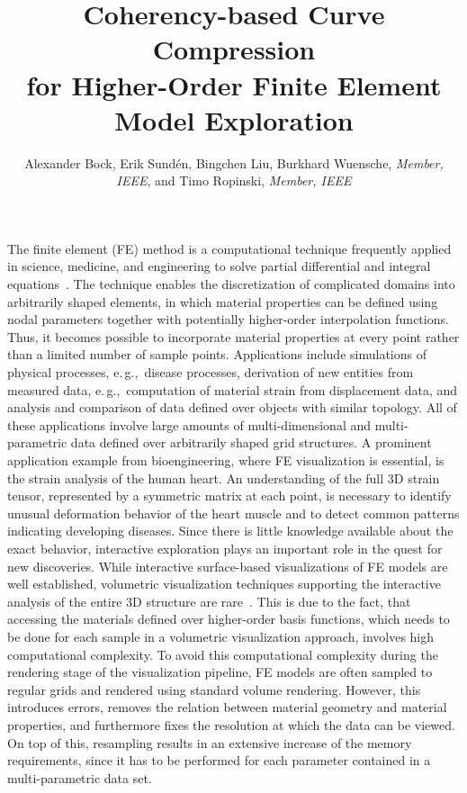 \documentclass[review,journal]{vgtc}         %
\title{Coherency-based Curve Compression\\ for Higher-Order Finite Element Model Exploration}
\author{Alexander Bock, Erik Sund\'en, Bingchen Liu, Burkhard Wuensche, \textit{Member, IEEE}, and Timo Ropinski, \textit{Member, IEEE}}
\begin{document}

\label{sec:introduction}

\maketitle

The finite element (FE) method is a computational technique frequently applied in science, medicine, and engineering to solve partial differential and integral equations~\cite{Young00}. The technique enables the discretization of complicated domains into arbitrarily shaped elements, in which material properties can be defined using nodal parameters together with potentially higher-order interpolation functions. Thus, it becomes possible to incorporate material properties at every point rather than a limited number of sample points. Applications include simulations of physical processes, e.\,g.,~disease processes, derivation of new entities from measured data, e.\,g.,~computation of material strain from displacement data, and analysis and comparison of data defined over objects with similar topology. All of these applications involve large amounts of multi-dimensional and multi-parametric data defined over arbitrarily shaped grid structures. A prominent application example from bioengineering, where FE visualization is essential, is the strain analysis of the human heart. An understanding of the full 3D strain tensor, represented by a symmetric matrix at each point, is necessary to identify unusual deformation behavior of the heart muscle and to detect common patterns indicating developing diseases. Since there is little knowledge available about the exact behavior, interactive exploration plays an important role in the quest for new discoveries. While interactive surface-based visualizations of FE models are well established, volumetric visualization techniques supporting the interactive analysis of the entire 3D structure are rare~\cite{Wihelms90}. This is due to the fact, that accessing the materials defined over higher-order basis functions, which needs to be done for each sample in a volumetric visualization approach, involves high computational complexity. To avoid this computational complexity during the rendering stage of the visualization pipeline, FE models are often sampled to regular grids and rendered using standard volume rendering. However, this introduces errors, removes the relation between material geometry and material properties, and furthermore fixes the resolution at which the data can be viewed. On top of this, resampling results in an extensive increase of the memory requirements, since it has to be performed for each parameter contained in a multi-parametric data set.
\end{document}
